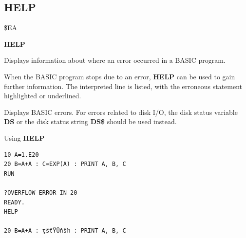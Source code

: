 
\newpage
\subsection{HELP}
\begin{description}[leftmargin=2cm,style=nextline]
\item [Token:]    \$EA

\item [Format:]   {\bf HELP}

\item [Usage:]    Displays information about where an error occurred in a BASIC program.

                  When the BASIC program stops due to an error, {\bf HELP} can be used to gain further information. The interpreted line is listed, with the erroneous statement highlighted or underlined.

\item [Remarks:]  Displays BASIC errors. For errors related to disk I/O, the disk status variable {\bf DS} or the disk status string {\bf DS\$} should be used instead.

\item [Example:]  Using {\bf HELP}

\begin{tcolorbox}[colback=black,coltext=white]
\verbatimfont{\codefont}
\begin{verbatim}
10 A=1.E20
20 B=A+A : C=EXP(A) : PRINT A, B, C
RUN

?OVERFLOW ERROR IN 20
READY.
HELP

20 B=A+A : ţŝťŸŰňšŉ : PRINT A, B, C
\end{verbatim}
\end{tcolorbox}
\end{description}


\newpage
